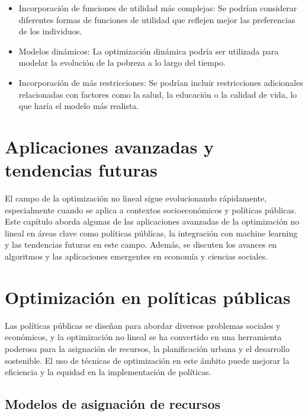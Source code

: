 \begin{itemize}
	\item Incorporación de funciones de utilidad más complejas: Se podrían considerar diferentes formas de funciones de utilidad que reflejen mejor las preferencias de los individuos.
	\item Modelos dinámicos: La optimización dinámica podría ser utilizada para modelar la evolución de la pobreza a lo largo del tiempo.
	\item Incorporación de más restricciones: Se podrían incluir restricciones adicionales relacionadas con factores como la salud, la educación o la calidad de vida, lo que haría el modelo más realista.
\end{itemize}
\section{Aplicaciones avanzadas y tendencias futuras}

\begin{flushleft}
	El campo de la optimización no lineal sigue evolucionando rápidamente, especialmente cuando se aplica a contextos socioeconómicos y políticas públicas. Este capítulo aborda algunas de las aplicaciones avanzadas de la optimización no lineal en áreas clave como políticas públicas, la integración con machine learning y las tendencias futuras en este campo. Además, se discuten los avances en algoritmos y las aplicaciones emergentes en economía y ciencias sociales.
\end{flushleft}

\section{Optimización en políticas públicas}

\begin{flushleft}
	Las políticas públicas se diseñan para abordar diversos problemas sociales y económicos, y la optimización no lineal se ha convertido en una herramienta poderosa para la asignación de recursos, la planificación urbana y el desarrollo sostenible. El uso de técnicas de optimización en este ámbito puede mejorar la eficiencia y la equidad en la implementación de políticas.
\end{flushleft}

\subsection{Modelos de asignación de recursos}

